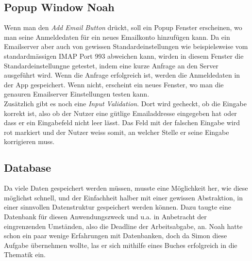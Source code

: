 \documentclass[a4paper,11pt]{article}
\begin{document}
\subsection{Popup Window Noah }
Wenn man den \textit{Add Email Button} drückt, soll ein Popup Fenster erscheinen, wo man seine Anmeldedaten für ein neues Emailkonto hinzufügen kann. Da ein Emailserver aber auch von gewissen Standardeinstellungen wie beispielsweise vom standardmässigen IMAP Port 993 abweichen kann, wirden in diesem Fenster die Standardeinstellungne getestet, indem eine kurze Anfrage an den Server ausgeführt wird. Wenn die Anfrage erfolgreich ist, werden die Anmeldedaten in der App gespeichert. Wenn nicht, erscheint ein neues Fenster, wo man die genauren Emailserver Einstellungen testen kann.\\

Zusätzlich gibt es noch eine \textit{Input Validation}. Dort wird gecheckt, ob die Eingabe korrekt ist, also ob der Nutzer eine gütlige Emailaddresse eingegeben hat oder dass er ein Eingabefeld nicht leer lässt. Das Feld mit der falschen Eingabe wird rot markiert und der Nutzer weiss somit, an welcher Stelle er seine Eingabe korrigieren muss.

\subsection{Database}


Da viele Daten gespeichert werden müssen, musste eine Möglichkeit her, wie diese möglichst schnell, und der Einfachheit halber mit einer gewissen Abstraktion, in einer sinnvollen Datenstruktur gespeichert werden können. Dazu taugte eine Datenbank für diesen Anwendungszweck und u.a. in Anbetracht der eingrenzenden Umständen, also die Deadline der Arbeitsabgabe, an. Noah hatte schon ein paar wenige Erfahrungen mit Datenbanken, doch da Simon diese Aufgabe übernehmen wollte, las er sich mithilfe eines Buches erfolgreich in die Thematik ein. \\

\end{document}
